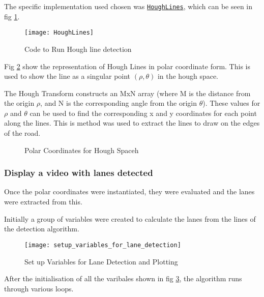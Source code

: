 \documentclass[conference]{IEEEtran}
\begin{document}
The specific implementation used chosen was \href{https://docs.opencv.org/3.4/d9/db0/tutorial_hough_lines.html}{\texttt{HoughLines}}, which can be seen in fig \ref{fig:HoughLines}.

\begin{figure}[H]
\centerline{\texttt{[image: HoughLines]}}
\caption{Code to Run Hough line detection}
\label{fig:HoughLines}
\end{figure}

Fig \ref{fig:Polar_Coordinates_for_Hough_transforms} show the representation of Hough Lines in polar coordinate form. This is used to show the line as a singular point $(\rho, \theta)$ in the hough space. 

The Hough Transform constructs an MxN array (where M is the distance from the origin $\rho$, and N is the corresponding angle from the origin $\theta$). These values for $\rho$ and $\theta$ can be used to find the corresponding x and y coordinates for each point along the lines. This is method was used to extract the lines to draw on the edges of the road. 

\begin{figure}[H]
\centering
{}
\caption{Polar Coordinates for Hough Spaceh}
\label{fig:Polar_Coordinates_for_Hough_transforms}
\end{figure} 

\subsubsection{Display a video with lanes detected}

Once the polar coordinates were instantiated, they were evaluated and the lanes were extracted from this. 

Initially a group of variables were created to calculate the lanes from the lines of the detection algorithm. 

\begin{figure}[H]
\centerline{\texttt{[image: setup\_variables\_for\_lane\_detection]}}
\caption{Set up Variables for Lane Detection and Plotting}
\label{fig:setup_variables_for_lane_detection}
\end{figure}

After the initialisation of all the varibales shown in fig \ref{fig:setup_variables_for_lane_detection}, the algorithm runs through various loops. 
\end{document}
